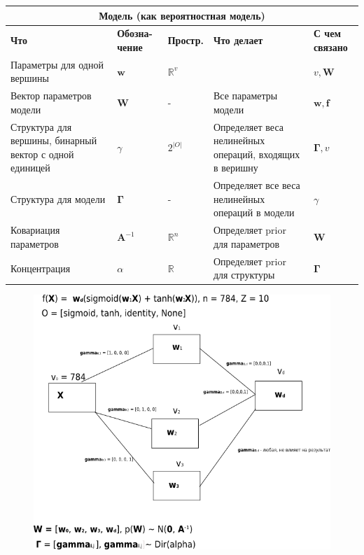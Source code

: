 \documentclass[12pt]{article}
\begin{document}
\begin{table}[tbh!]
\small
\begin{tabularx}{\textwidth}{|X|p{1.5cm}|p{1.5cm}|X|p{1.5cm}|}
\hline
\multicolumn{5}{c}{Модель (как вероятностная модель)}\\\hline
\bf Что & \bf Обозна- чение & \bf Простр. & \bf Что делает & \bf С чем связано  \\ \hline \hline
Параметры для одной вершины & $\mathbf{w}$ & $\mathbb{R}^{v}$ & & $v, \mathbf{W}$ \\ \hline 
Вектор параметров модели & $\mathbf{W}$ & - & Все параметры модели & $\mathbf{w}, \mathbf{f}$ \\ \hline
Структура для вершины, бинарный вектор с одной единицей & $\gamma$ & $2^{|O|}$ & Определяет веса нелинейных операций, входящих в веришну & $\boldsymbol{\Gamma}, v$ \\ \hline
Структура для модели & $\boldsymbol{\Gamma}$ & - & Определяет все веса нелинейных операций в модели & $\gamma$ \\ \hline
Ковариация параметров & $\mathbf{A}^{-1}$ & $\mathbb{R}^n$ & Определяет prior для параметров & $\mathbf{W}$ \\ \hline
Концентрация & $\alpha$  & $\mathbb{R}$ & Определяет prior для структуры & $\boldsymbol{\Gamma}$ \\ \hline
 
\end{tabularx}
\end{table}
\clearpage
\begin{figure}[TBPH!]
\includegraphics[width=\textwidth]{model_search.png}
\end{figure}
 
\end{document}
